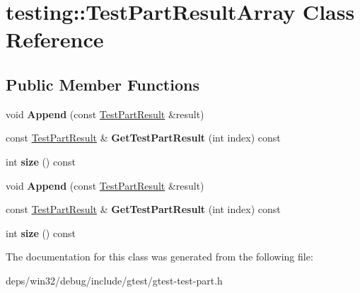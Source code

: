 \hypertarget{classtesting_1_1_test_part_result_array}{}\section{testing\+:\+:Test\+Part\+Result\+Array Class Reference}
\label{classtesting_1_1_test_part_result_array}
\subsection*{Public Member Functions}
\begin{DoxyCompactItemize}
\item 
\hypertarget{classtesting_1_1_test_part_result_array_a01844bd505b18a666324617a1b459558}{}void {\bfseries Append} (const \hyperlink{classtesting_1_1_test_part_result}{Test\+Part\+Result} \&result)\label{classtesting_1_1_test_part_result_array_a01844bd505b18a666324617a1b459558}

\item 
\hypertarget{classtesting_1_1_test_part_result_array_a2b3dbf4012f204d916ce4a374bc03da4}{}const \hyperlink{classtesting_1_1_test_part_result}{Test\+Part\+Result} \& {\bfseries Get\+Test\+Part\+Result} (int index) const \label{classtesting_1_1_test_part_result_array_a2b3dbf4012f204d916ce4a374bc03da4}

\item 
\hypertarget{classtesting_1_1_test_part_result_array_acd805ad4edda06d983456b2a30760dce}{}int {\bfseries size} () const \label{classtesting_1_1_test_part_result_array_acd805ad4edda06d983456b2a30760dce}

\item 
\hypertarget{classtesting_1_1_test_part_result_array_a01844bd505b18a666324617a1b459558}{}void {\bfseries Append} (const \hyperlink{classtesting_1_1_test_part_result}{Test\+Part\+Result} \&result)\label{classtesting_1_1_test_part_result_array_a01844bd505b18a666324617a1b459558}

\item 
\hypertarget{classtesting_1_1_test_part_result_array_a2b3dbf4012f204d916ce4a374bc03da4}{}const \hyperlink{classtesting_1_1_test_part_result}{Test\+Part\+Result} \& {\bfseries Get\+Test\+Part\+Result} (int index) const \label{classtesting_1_1_test_part_result_array_a2b3dbf4012f204d916ce4a374bc03da4}

\item 
\hypertarget{classtesting_1_1_test_part_result_array_acd805ad4edda06d983456b2a30760dce}{}int {\bfseries size} () const \label{classtesting_1_1_test_part_result_array_acd805ad4edda06d983456b2a30760dce}

\end{DoxyCompactItemize}


The documentation for this class was generated from the following file\+:\begin{DoxyCompactItemize}
\item 
deps/win32/debug/include/gtest/gtest-\/test-\/part.\+h\end{DoxyCompactItemize}

